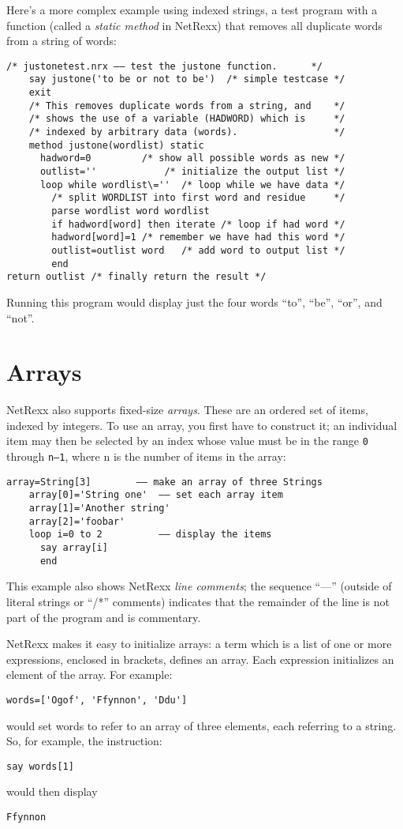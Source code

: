 Here’s a more complex example using indexed strings, a test program
with a function (called a \emph{static method} in NetRexx) that removes all
duplicate words from a string of words:
\begin{lstlisting}[label=justone,caption=justonetest.nrx]
    /* justonetest.nrx –– test the justone function.      */
    say justone('to be or not to be')  /* simple testcase */
    exit
    /* This removes duplicate words from a string, and    */
    /* shows the use of a variable (HADWORD) which is     */
    /* indexed by arbitrary data (words).                 */
    method justone(wordlist) static
      hadword=0         /* show all possible words as new */
      outlist=''            /* initialize the output list */
      loop while wordlist\=''  /* loop while we have data */
        /* split WORDLIST into first word and residue     */
        parse wordlist word wordlist
        if hadword[word] then iterate /* loop if had word */
        hadword[word]=1 /* remember we have had this word */
        outlist=outlist word   /* add word to output list */
        end
return outlist /* finally return the result */
\end{lstlisting}
Running this program would display just the four words “to”, “be”, “or”, and “not”.
\section{Arrays}
NetRexx also supports fixed-size \emph{arrays}. These are an ordered set of
items, indexed by integers. To use an array, you first have to
construct it; an individual item may then be selected by an index
whose value must be in the range \texttt{0} through \texttt{n–1}, where n is the number
of items in the array:
\begin{lstlisting}[label=arrays,caption=Arrays]
    array=String[3]        –– make an array of three Strings
    array[0]='String one'  –– set each array item
    array[1]='Another string'
    array[2]='foobar'
    loop i=0 to 2          –– display the items
      say array[i]
      end
\end{lstlisting}
This example also shows NetRexx \emph{line comments}; the sequence “––” (outside of literal strings or “/*” comments) indicates that the remainder of the line is not part of the program and is commentary.

NetRexx makes it easy to initialize arrays: a term which is a list of
one or more expressions, enclosed in brackets, defines an array. Each
expression initializes an element of the array. For example:
\begin{lstlisting}[label=initializingelements,caption=Initializing elements]
words=['Ogof', 'Ffynnon', 'Ddu']
\end{lstlisting}
would set words to refer to an array of three elements, each referring to a string. So, for
example, the instruction:
\begin{lstlisting}[label=addresselement,caption=Address Array Element]
say words[1]
\end{lstlisting}
would then display 
\begin{verbatim}
Ffynnon
\end{verbatim}


